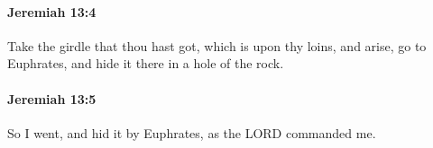 		\paragraph{Jeremiah 13:4} %
			\label{JEREMIAH-13-4}

			Take the girdle that thou hast got, which is upon thy loins, and arise, go to Euphrates, and hide it there in a hole of the rock.


		\paragraph{Jeremiah 13:5} %
			\label{JEREMIAH-13-5}

			So I went, and hid it by Euphrates, as the LORD commanded me.


